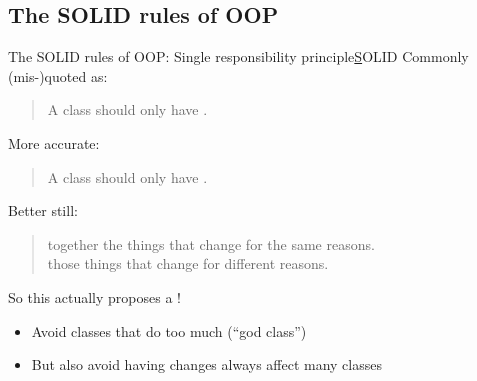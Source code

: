 \subsection{The SOLID rules of OOP}

%	

\begin{frame}{The SOLID rules of OOP: Single responsibility principle}{\underline SOLID}
	Commonly (mis-)quoted as:
	
	\begin{quote}
		A class should only have .
	\end{quote}

	More accurate:
	
	\begin{quote}
		A class should only have .
	\end{quote}

	Better still:
	\begin{quote}
		 together the things that change for the same reasons. \\
		 those things that change for different reasons.
	\end{quote}

	So this actually proposes a !
	\begin{itemize}
		\item Avoid classes that do too much (\enquote{god class})
		\item But also avoid having changes always affect many classes
	\end{itemize}
\end{frame}

